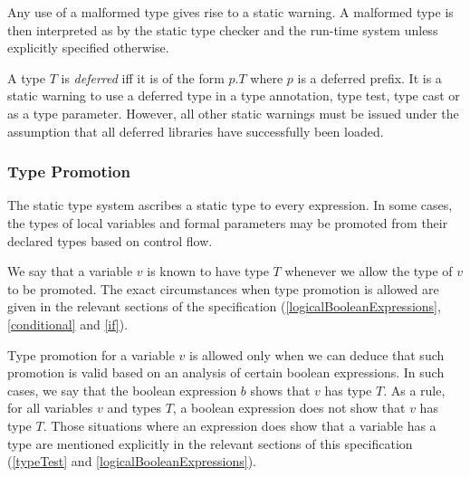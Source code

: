 \documentclass{article}
\begin{document}
\LMHash{}
 Any use of a malformed type gives rise to a static warning.
A malformed type is then interpreted as \DYNAMIC{} by the static type checker and the run-time system unless explicitly specified otherwise.


\LMHash{}
A type $T$ is {\em deferred} if{}f it is of the form $p.T$ where $p$ is a deferred prefix.
It is a static warning to use a deferred type in a type annotation, type test, type cast or as a type parameter.
However, all other static warnings must be issued under the assumption that all deferred libraries have successfully been loaded.



\subsubsection{Type Promotion}

\LMHash{}
The static type system ascribes a static type to every expression.
In some cases, the types of local variables and formal parameters may be promoted from their declared types based on control flow.

\LMHash{}
We say that a variable $v$ is known to have type $T$ whenever we allow the type of $v$ to be promoted.
The exact circumstances when type promotion is allowed are given in the relevant sections of the specification (\ref{logicalBooleanExpressions}, \ref{conditional} and \ref{if}).

\LMHash{}
Type promotion for a variable $v$ is allowed only when we can deduce that such promotion is valid based on an analysis of certain boolean expressions.
In such cases, we say that the boolean expression $b$ shows that $v$ has type $T$.
As a rule, for all variables $v$ and types $T$, a boolean expression does not show that $v$ has type $T$.
Those situations where an expression does show that a variable has a type are mentioned explicitly in the relevant sections of this specification (\ref{typeTest} and \ref{logicalBooleanExpressions}).
\end{document}
